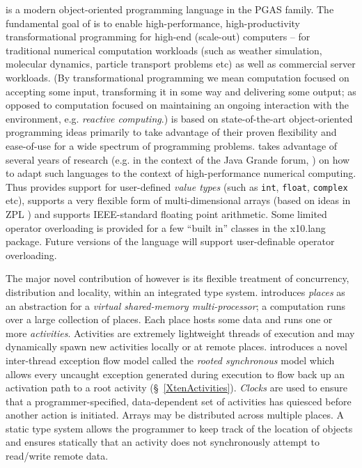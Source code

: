 \Xten{} is a modern object-oriented programming language
in the PGAS family. The fundamental goal of \Xten{} is to enable
high-performance, high-productivity transformational programming for
high-end (scale-out) computers -- for traditional numerical
computation workloads (such as weather simulation, molecular dynamics,
particle transport problems etc) as well as commercial server
workloads. (By transformational programming we mean computation
focused on accepting some input, transforming it in some way and
delivering some output; as opposed to computation focused on
maintaining an ongoing interaction with the environment, e.g.{} {\em
reactive computing}.) \Xten{} is based on state-of-the-art object-oriented
programming ideas primarily to take advantage of their proven
flexibility and ease-of-use for a wide spectrum of programming
problems. \Xten{} takes advantage of several years of research (e.g.{}
in the context of the Java Grande forum,
\cite{moreira00java,kava}) on how to adapt such languages to the context of
high-performance numerical computing. Thus \Xten{} provides support
for user-defined {\em value types} (such as {\tt int}, {\tt float},
{\tt complex} etc), supports a very
flexible form of multi-dimensional arrays (based on ideas in ZPL
\cite{zpl}) and supports IEEE-standard floating point arithmetic.
Some limited operator overloading is provided for a few ``built in''
classes in the {\cf x10.lang} package.  Future versions of the
language will support user-definable operator overloading.

The major novel contribution of \Xten{} however is its flexible
treatment of concurrency, distribution and locality, within an
integrated type system. \Xten{} introduces {\em places} as an
abstraction for a {\em virtual shared-memory multi-processor}; a
computation runs over a large collection of places. Each place hosts
some data and runs one or more {\em activities}. Activities are
extremely lightweight threads of execution and may dynamically spawn
new activities locally or at remote places. \Xten{} introduces a novel
inter-thread exception flow model called the {\em rooted synchronous}
model which allows every uncaught exception generated during execution
to flow back up an activation path to a root activity
(\S~\ref{XtenActivities}).  {\em Clocks} are used to ensure that a
programmer-specified, data-dependent set of activities has quiesced
before another action is initiated. Arrays may be distributed across
multiple places. A static type system allows the programmer to keep
track of the location of objects and ensures statically that an
activity does not synchronously attempt to read/write remote data.

